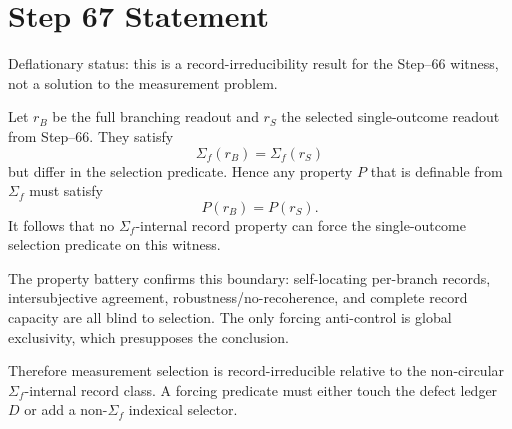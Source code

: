 \documentclass[11pt]{article}
\begin{document}
\section*{Step 67 Statement}
Deflationary status: this is a record-irreducibility result for the Step--66 witness, not a solution to the measurement problem.

Let \(r_B\) be the full branching readout and \(r_S\) the selected single-outcome readout from Step--66. They satisfy
\[
\Sigma_f(r_B)=\Sigma_f(r_S)
\]
but differ in the selection predicate. Hence any property \(P\) that is definable from \(\Sigma_f\) must satisfy
\[
P(r_B)=P(r_S).
\]
It follows that no \(\Sigma_f\)-internal record property can force the single-outcome selection predicate on this witness.

The property battery confirms this boundary: self-locating per-branch records, intersubjective agreement, robustness/no-recoherence, and complete record capacity are all blind to selection. The only forcing anti-control is global exclusivity, which presupposes the conclusion.

Therefore measurement selection is record-irreducible relative to the non-circular \(\Sigma_f\)-internal record class. A forcing predicate must either touch the defect ledger \(D\) or add a non-\(\Sigma_f\) indexical selector.
\end{document}
